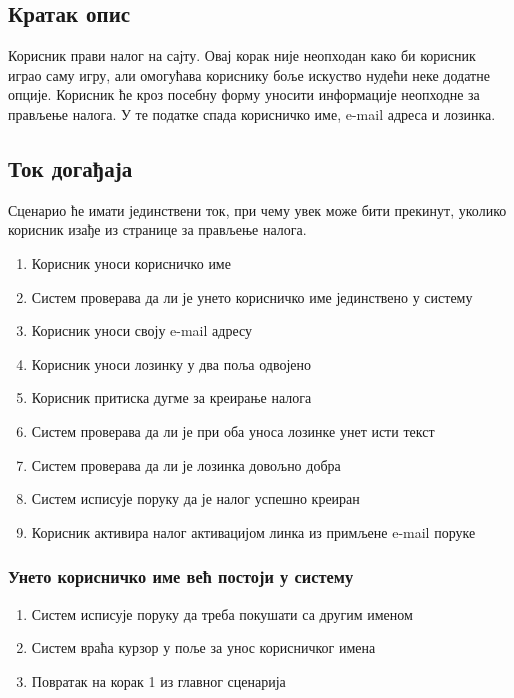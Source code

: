\subsection{Кратак опис}
Корисник прави налог на сајту. Овај корак није неопходан како би корисник играо саму
игру, али омогућава кориснику боље искуство нудећи неке додатне опције. Корисник ће кроз
посебну форму уносити информације неопходне за прављење налога. У те податке спада
корисничко име, e-mail адреса и лозинка.

\subsection{Ток догађаја}
Сценарио ће имати јединствени ток, при чему увек може бити прекинут, уколико корисник
изађе из странице за прављење налога.

\begin{enumerate}
    \item Корисник уноси корисничко име
    \item Систем проверава да ли је унето корисничко име јединствено у систему
    \item Корисник уноси своју e-mail адресу
    \item Корисник уноси лозинку у два поља одвојено
    \item Корисник притиска дугме за креирање налога
    \item Систем проверава да ли је при оба уноса лозинке унет исти текст
    \item Систем проверава да ли је лозинка довољно добра
    \item Систем исписује поруку да је налог успешно креиран
    \item Корисник активира налог активацијом линка из примљене e-mail поруке
\end{enumerate}

\subsubsection{Унето корисничко име већ постоји у систему}
\begin{enumerate}[label=2.\arabic*]
    \item Систем исписује поруку да треба покушати са другим именом
    \item Систем враћа курзор у поље за унос корисничког имена
    \item Повратак на корак 1 из главног сценарија
\end{enumerate}

